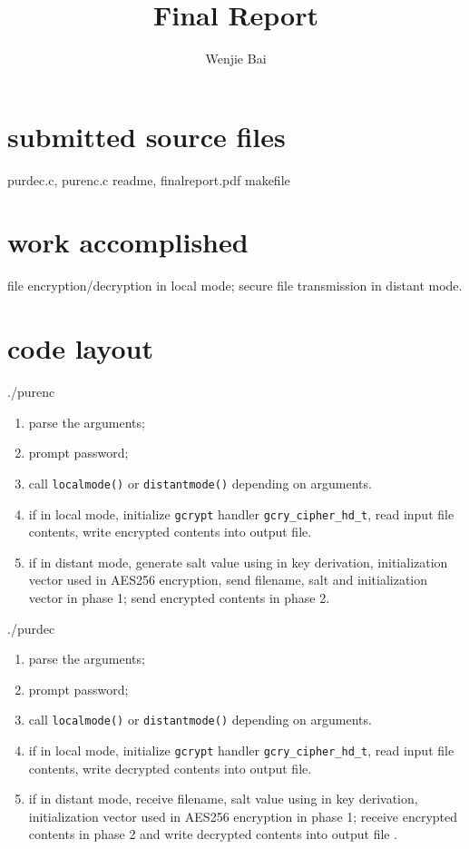 \documentclass[11pt, oneside]{article}   	%
\title{Final Report}
\author{Wenjie Bai}
\date{}							%
\begin{document}
\maketitle

\section{submitted source files}
purdec.c, purenc.c readme, finalreport.pdf makefile

\section{work accomplished}
file encryption/decryption in local mode; secure file transmission in distant mode. 
\section{code layout}
./purenc

\begin{enumerate}
\item parse the arguments;
\item prompt password;
\item call \texttt{localmode()} or \texttt{distantmode()} depending on arguments.
\item if in local mode,  initialize \texttt{gcrypt} handler \verb|gcry_cipher_hd_t|, read input file contents, write encrypted contents into output file.
\item if in distant mode, generate salt value using in key derivation, initialization vector used in AES256 encryption, send filename, salt and initialization vector in phase 1; send encrypted contents in phase 2.
\end{enumerate}

./purdec

\begin{enumerate}
\item parse the arguments;
\item prompt password;
\item call \texttt{localmode()} or \texttt{distantmode()} depending on arguments.
\item if in local mode,  initialize \texttt{gcrypt} handler \verb|gcry_cipher_hd_t|, read input file contents, write decrypted contents into output file.
\item if in distant mode, receive filename, salt value using in key derivation, initialization vector used in AES256 encryption in phase 1; receive encrypted contents in phase 2 and write decrypted contents into output file .
\end{enumerate}
\end{document}

